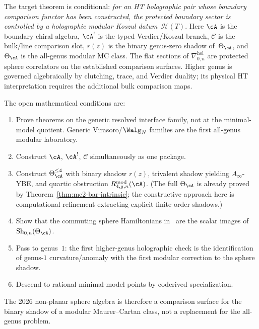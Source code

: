 \begin{remark}
\label{rem:mature-platonic-statement}
The target theorem is conditional:
\emph{for an HT holographic pair whose boundary comparison functor has
been constructed, the protected boundary sector is controlled by a
holographic modular Koszul datum~$\mathcal{H}(T)$}. Here $\cA$ is the
boundary chiral algebra, $\cA^!$ is the typed Verdier/Koszul branch,
$\mathcal C$ is the bulk/line comparison slot, $r(z)$ is the binary
genus-zero shadow of~$\Theta_\cA$, and $\Theta_\cA$ is the all-genus
modular MC class. The flat sections of
$\nabla^{\mathrm{hol}}_{0,n}$ are protected sphere correlators on the
established comparison surfaces. Higher genus is governed algebraically
by clutching, trace, and Verdier duality; its physical HT interpretation
requires the additional bulk comparison maps.

The open mathematical conditions are:
\begin{enumerate}[label=\textup{(\arabic*)}]
\item Prove theorems on the generic resolved interface family, not
 at the minimal-model quotient. Generic Virasoro/$\Walg_N$ families
 are the first all-genus modular laboratory.
\item Construct $\cA$, $\cA^!$, $\mathcal{C}$ simultaneously as one
 package.
\item Construct $\Theta_\cA^{\leq 4}$ with binary shadow $r(z)$,
 trivalent shadow yielding $A_\infty$-YBE, and quartic obstruction
 $R^{\mathrm{mod}}_{4,g,n}(\cA)$. \textup{(}The full
 $\Theta_\cA$ is already proved by
 Theorem~\ref{thm:mc2-bar-intrinsic}; the constructive approach here
 is computational refinement extracting explicit finite-order
 shadows.\textup{)}
\item Show that the commuting sphere Hamiltonians in~\textup{\cite{GZ26}}
 are the scalar images of $\operatorname{Sh}_{0,n}(\Theta_\cA)$.
\item Pass to genus~$1$: the first higher-genus holographic check is
 the identification of genus-$1$ curvature/anomaly with the first
 modular correction to the sphere shadow.
\item Descend to rational minimal-model points by coderived
 specialization.
\end{enumerate}
The 2026 non-planar sphere algebra is therefore a comparison surface
for the binary shadow of a modular Maurer--Cartan class, not a
replacement for the all-genus problem.
\end{remark}



